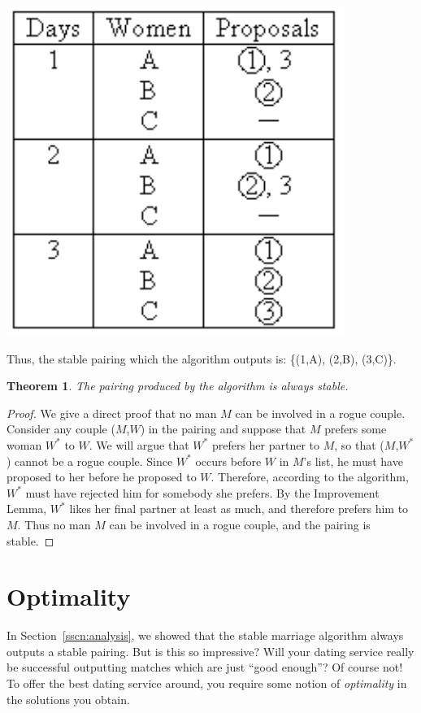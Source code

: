 \documentclass[11pt,fleqn]{article}
\newcounter{thm}
\newtheorem{theorem}{Theorem}[thm]
\begin{document}
\begin{center}
\includegraphics[scale = 0.7]{newstable}
\end{center}

\noindent Thus, the stable pairing which the algorithm outputs is:
\{(1,A), (2,B), (3,C)\}.

\begin{theorem}\label{thm:stable}
    The pairing produced by the algorithm is always stable.
\end{theorem}
\begin{proof}
We give a direct proof that no man $M$ can be involved in a rogue couple.
Consider any couple ($M$,$W$) in the
pairing and suppose that $M$ prefers some woman $W^\ast$ to $W$.
We will argue that $W^\ast$ prefers her partner to $M$, so that
($M$,$W^\ast$) cannot be a rogue couple. Since $W^\ast$
occurs before $W$ in $M$'s list, he must have proposed to her before he
proposed to $W$. Therefore, according
to the algorithm, $W^\ast$ must have rejected him for somebody she
prefers.
By the Improvement Lemma, $W^\ast$ likes her final partner at least as
much, and therefore prefers him to $M$.
Thus no man $M$ can be involved in a rogue couple, and the pairing is
stable.
\end{proof}

\section{Optimality}\label{scn:optimality}

In Section~\ref{sscn:analysis}, we showed that the stable marriage algorithm always outputs a stable pairing. But is this so impressive? Will your dating service really be successful outputting matches which are just ``good enough''? Of course not! To offer the best dating service around, you require some notion of \emph{optimality} in the solutions you obtain.
\end{document}
